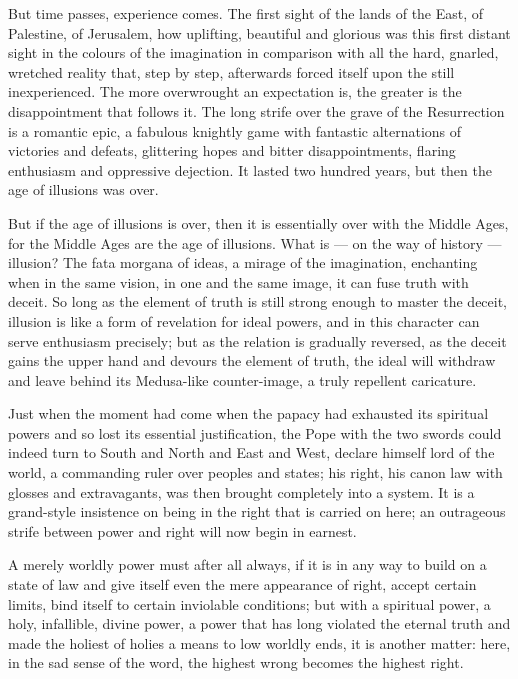 \documentclass[12pt,a4paper,openany]{book}
\newcommand{\opage}[1]{\marginnote{\footnotesize\textit{[#1]}}}
\begin{document}
But time passes, experience comes. The first sight
of the lands of the East, of Palestine, of Jerusalem, how
uplifting, beautiful and glorious was this first distant sight in the colours of the imagination
in comparison with all the hard,
gnarled, wretched reality that, step by step, afterwards
forced itself upon the still inexperienced. The more overwrought an
expectation is, the greater is the disappointment that
follows it. The long strife over the grave of the Resurrection is
a romantic epic, a fabulous knightly game with fantastic
alternations of victories and defeats, glittering hopes
and bitter disappointments, flaring enthusiasm and oppressive
dejection. It lasted two hundred years, but then
the age of illusions was over.

But if the age of illusions is over, then it is essentially
over with the Middle Ages, for the Middle Ages are the age of illusions. What is ---
on the way of history --- illusion? The fata morgana of ideas, a mirage of the imagination,
enchanting when in the same vision, in one and the
same image, it can fuse truth with deceit.
So long as the element of truth is still strong enough to master
the deceit, illusion is like a form of revelation for ideal
powers, and in this character can serve enthusiasm precisely;
but as the relation is gradually reversed, as
the deceit gains the upper hand and devours the element of truth,
\opage{10}the ideal will withdraw and leave behind its Medusa-like counter-image,
a truly repellent caricature.

Just when the moment had come when the papacy
had exhausted its spiritual powers and so lost its
essential justification, the Pope with the two swords could
indeed turn to South and North and East and West, declare himself
lord of the world, a commanding ruler over peoples and states;
his right, his canon law with glosses and extravagants,
was then brought completely into a system. It is a grand-style
insistence on being in the right that is carried on here; an outrageous strife between power and
right will now begin in earnest.

A merely worldly power must after all always, if it is
in any way to build on a state of law and give itself
even the mere appearance of right, accept certain limits, bind
itself to certain inviolable conditions; but with a spiritual power,
a holy, infallible, divine power, a power that has long
violated the eternal truth and made the holiest of holies a
means to low worldly ends, it is another matter:
here, in the sad sense of the word, the highest wrong becomes the
highest right.
\end{document}

